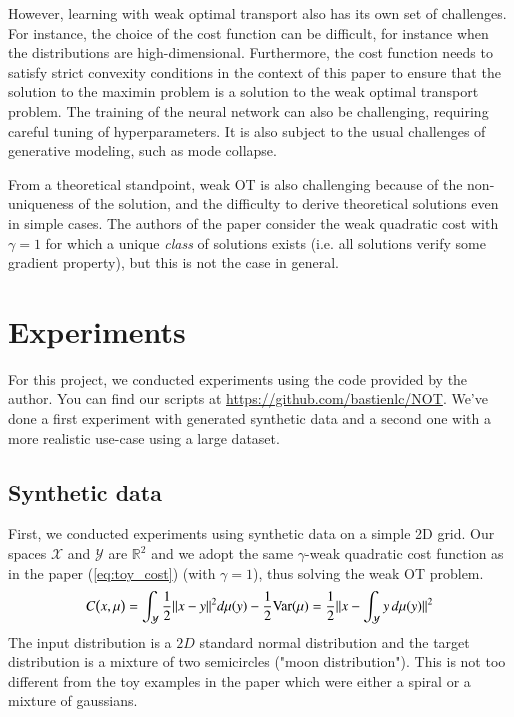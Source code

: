 \documentclass[11pt]{article}
\newcommand{\R}{\mathbb{R}}
\begin{document}
However, learning with weak optimal transport also has its own set of challenges. For instance, the choice of the cost function can be difficult, for instance when the distributions are high-dimensional. Furthermore, the cost function needs to satisfy strict convexity conditions in the context of this paper to ensure that the solution to the maximin problem is a solution to the weak optimal transport problem. The training of the neural network can also be challenging, requiring careful tuning of hyperparameters. It is also subject to the usual challenges of generative modeling, such as mode collapse.

From a theoretical standpoint, weak OT is also challenging because of the non-uniqueness of the solution, and the difficulty to derive theoretical solutions even in simple cases. The authors of the paper consider the weak quadratic cost with $\gamma=1$ for which a unique \textit{class} of solutions exists (i.e. all solutions verify some gradient property), but this is not the case in general.

\section{Experiments}

For this project, we conducted experiments using the code provided by the author. You can find our scripts at \href{https://github.com/bastienlc/NOT}{https://github.com/bastienlc/NOT}. We've done a first experiment with generated synthetic data and a second one with a more realistic use-case using a large dataset.

\subsection{Synthetic data}

First, we conducted experiments using synthetic data on a simple 2D grid. Our spaces $\mathcal{X}$ and $\mathcal{Y}$ are $\R^2$ and we adopt the same $\gamma$-weak quadratic cost function as in the paper (\ref{eq:toy_cost}) (with $\gamma=1$), thus solving the weak OT problem.
\begin{equation}
    C\big{(}x,\mu\big{)}=\int_{\mathcal{Y}}\frac{1}{2}\|x-y\|^{2}d\mu(y)-\frac{1}{2} \text{Var}(\mu)=\frac{1}{2}\|x-\int_{\mathcal{Y}}y\,d\mu(y)\|^{2}
    \label{eq:toy_cost}
\end{equation}
The input distribution is a $2D$ standard normal distribution and the target distribution is a mixture of two semicircles ("moon distribution"). This is not too different from the toy examples in the paper which were either a spiral or a mixture of gaussians.
\end{document}
